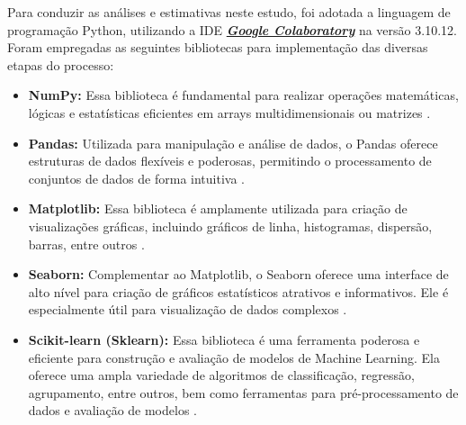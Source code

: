\documentclass[a4paper,12pt]{article} %
\begin{document}
Para conduzir as análises e estimativas neste estudo, foi adotada a linguagem de programação Python, utilizando a IDE \href{https://colab.research.google.com/}{\textit{\textbf{Google Colaboratory}}} na versão 3.10.12. Foram empregadas as seguintes bibliotecas para implementação das diversas etapas do processo:

\begin{itemize}
    \item \textbf{NumPy:} Essa biblioteca é fundamental para realizar operações matemáticas, lógicas e estatísticas eficientes em arrays multidimensionais ou matrizes \cite{numpy}.
    \item \textbf{Pandas:} Utilizada para manipulação e análise de dados, o Pandas oferece estruturas de dados flexíveis e poderosas, permitindo o processamento de conjuntos de dados de forma intuitiva \cite{pandas, mckinney-proc-scipy-2010}.
    \item \textbf{Matplotlib:} Essa biblioteca é amplamente utilizada para criação de visualizações gráficas, incluindo gráficos de linha, histogramas, dispersão, barras, entre outros \cite{matplotlib}.
    \item \textbf{Seaborn:} Complementar ao Matplotlib, o Seaborn oferece uma interface de alto nível para criação de gráficos estatísticos atrativos e informativos. Ele é especialmente útil para visualização de dados complexos \cite{seaborn}.
    \item \textbf{Scikit-learn (Sklearn):} Essa biblioteca é uma ferramenta poderosa e eficiente para construção e avaliação de modelos de Machine Learning. Ela oferece uma ampla variedade de algoritmos de classificação, regressão, agrupamento, entre outros, bem como ferramentas para pré-processamento de dados e avaliação de modelos \cite{sklearn, sklearn_api}.
\end{itemize}
\end{document}
